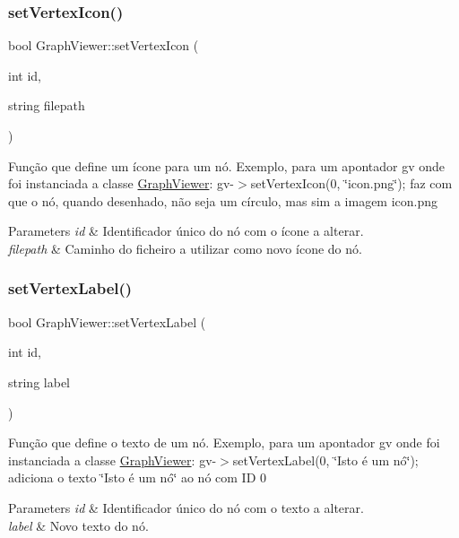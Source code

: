 \subsubsection{\texorpdfstring{set\+Vertex\+Icon()}{setVertexIcon()}}
{\footnotesize\ttfamily bool Graph\+Viewer\+::set\+Vertex\+Icon (\begin{DoxyParamCaption}\item[{int}]{id,  }\item[{string}]{filepath }\end{DoxyParamCaption})}

Função que define um ícone para um nó. Exemplo, para um apontador gv onde foi instanciada a classe \mbox{\hyperlink{class_graph_viewer}{Graph\+Viewer}}\+: gv-\/$>$set\+Vertex\+Icon(0, \char`\"{}icon.\+png\char`\"{}); faz com que o nó, quando desenhado, não seja um círculo, mas sim a imagem icon.\+png


\begin{DoxyParams}{Parameters}
{\em id} & Identificador único do nó com o ícone a alterar. \\
\hline
{\em filepath} & Caminho do ficheiro a utilizar como novo ícone do nó. \\
\hline
\end{DoxyParams}
\mbox{\label{class_graph_viewer_ac25d7d007022fda16799808ba136e909}} 
\subsubsection{\texorpdfstring{set\+Vertex\+Label()}{setVertexLabel()}}
{\footnotesize\ttfamily bool Graph\+Viewer\+::set\+Vertex\+Label (\begin{DoxyParamCaption}\item[{int}]{id,  }\item[{string}]{label }\end{DoxyParamCaption})}

Função que define o texto de um nó. Exemplo, para um apontador gv onde foi instanciada a classe \mbox{\hyperlink{class_graph_viewer}{Graph\+Viewer}}\+: gv-\/$>$set\+Vertex\+Label(0, \char`\"{}\+Isto é um nó\char`\"{}); adiciona o texto \char`\"{}\+Isto é um nó\char`\"{} ao nó com ID 0


\begin{DoxyParams}{Parameters}
{\em id} & Identificador único do nó com o texto a alterar. \\
\hline
{\em label} & Novo texto do nó. \\
\hline
\end{DoxyParams}
\mbox{\label{class_graph_viewer_ae930dfdfcdeb7a871eefb6028d74b9f9}} 
